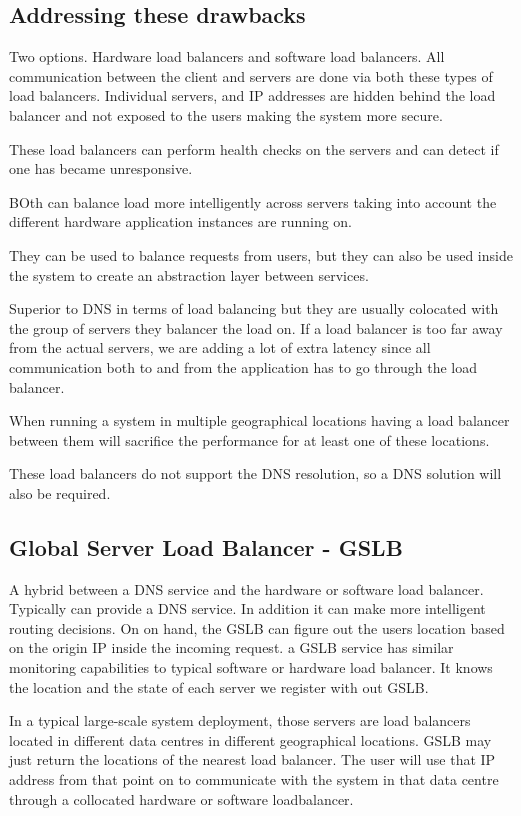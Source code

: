 \documentclass[a4paper, 11pt]{book}
\begin{document}
    \subsection{Addressing these drawbacks}
    Two options.
    Hardware load balancers and software load balancers.
    All communication between the client and servers are done via both these types of load balancers.
    Individual servers, and IP addresses are hidden behind the load balancer and not exposed to the users making the system more secure.

    These load balancers can perform health checks on the servers and can detect if one has became unresponsive.

    BOth can balance load more intelligently across servers taking into account the different hardware application instances are running on.

    They can be used to balance requests from users, but they can also be used inside the system to create an abstraction layer between services.

    Superior to DNS in terms of load balancing but they are usually colocated with the group of servers they balancer the load on.
    If a load balancer is too far away from the actual servers, we are adding a lot of extra latency since all communication both to and from the application has to go through the load balancer.

    When running a system in multiple geographical locations having a load balancer between them will sacrifice the performance for at least one of these locations.

    These load balancers do not support the DNS resolution, so a DNS solution will also be required.

    \subsection{Global Server Load Balancer - GSLB}
    A hybrid between a DNS service and the hardware or software load balancer.
    Typically can provide a DNS service.
    In addition it can make more intelligent routing decisions.
    On on hand, the GSLB can figure out the users location based on the origin IP inside the incoming request.
    a GSLB service has similar monitoring capabilities to typical software or hardware load balancer.
    It knows the location and the state of each server we register with out GSLB.

    In a typical large-scale system deployment, those servers are load balancers located in different data centres in different geographical locations.
    GSLB may just return the locations of the nearest load balancer.
    The user will use that IP address from that point on to communicate with the system in that data centre through a collocated hardware or software loadbalancer.
\end{document}
